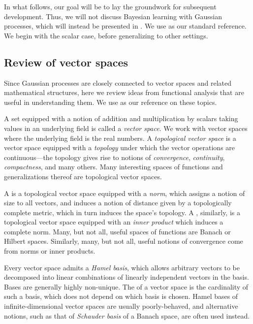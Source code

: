\documentclass[11pt]{book}
\begin{document}
In what follows, our goal will be to lay the groundwork for subsequent development.
Thus, we will not discuss Bayesian learning with Gaussian processes, which will instead be presented in .
We use \textcite{lifshits12} as our standard reference.
We begin with the scalar case, before generalizing to other settings.

\subsection{Review of vector spaces}
Since Gaussian processes are closely connected to vector spaces and related mathematical structures, here we review ideas from functional analysis that are useful in understanding them.
We use \textcite{lang12} as our reference on these topics.

A set equipped with a notion of addition and multiplication by scalars taking values in an underlying field is called a \emph{vector space}.
We work with vector spaces where the underlying field is the real numbers.
A \emph{topological vector space} is a vector space equipped with a \emph{topology} under which the vector operations are continuous---the topology gives rise to notions of \emph{convergence}, \emph{continuity}, \emph{compactness}, and many others.
Many interesting spaces of functions and generalizations thereof are topological vector spaces.

A  is a topological vector space equipped with a \emph{norm}, which assigns a notion of size to all vectors, and induces a notion of distance given by a topologically complete metric, which in turn induces the space's topology.
A , similarly, is a topological vector space equipped with an \emph{inner product} which induces a complete norm.
Many, but not all, useful spaces of functions are Banach or Hilbert spaces.
Similarly, many, but not all, useful notions of convergence come from norms or inner products.

Every vector space admits a \emph{Hamel basis}, which allows arbitrary vectors to be decomposed into linear combinations of linearly independent vectors in the basis.
Bases are generally highly non-unique.
The  of a vector space is the cardinality of such a basis, which does not depend on which basis is chosen.
Hamel bases of infinite-dimensional vector spaces are usually poorly-behaved, and alternative notions, such as that of \emph{Schauder basis} of a Banach space, are often used instead.
\end{document}
